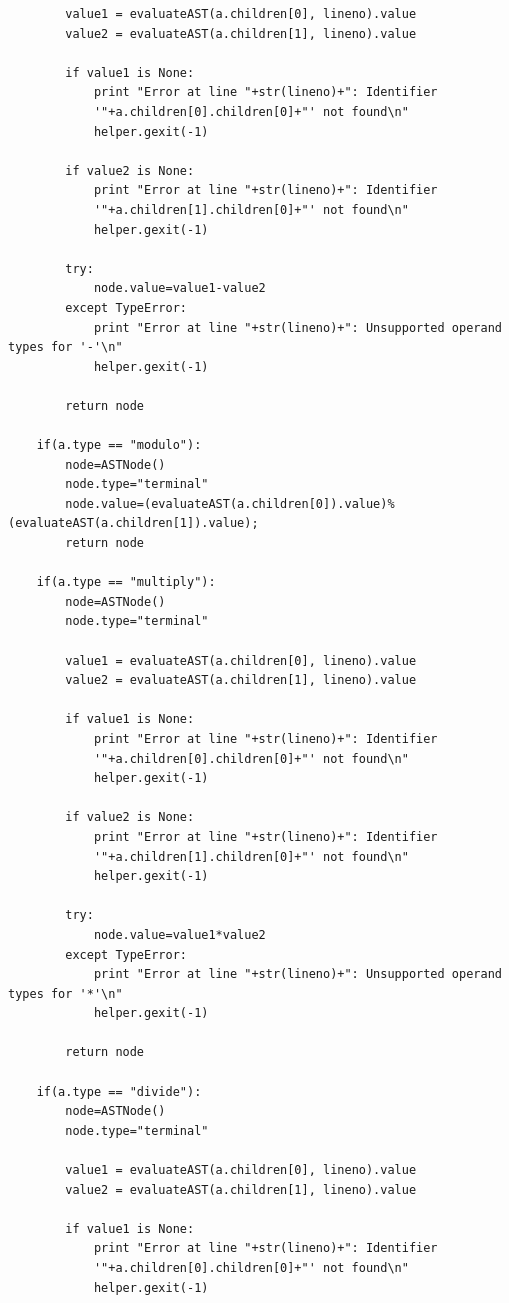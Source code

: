\documentclass[a4paper]{article}
\begin{document}
\begin{verbatim}
        value1 = evaluateAST(a.children[0], lineno).value
        value2 = evaluateAST(a.children[1], lineno).value

        if value1 is None:
            print "Error at line "+str(lineno)+": Identifier 
            '"+a.children[0].children[0]+"' not found\n"
            helper.gexit(-1)
            
        if value2 is None:
            print "Error at line "+str(lineno)+": Identifier 
            '"+a.children[1].children[0]+"' not found\n"
            helper.gexit(-1)

        try:
            node.value=value1-value2
        except TypeError:
            print "Error at line "+str(lineno)+": Unsupported operand types for '-'\n"
            helper.gexit(-1)

        return node
        
    if(a.type == "modulo"):
        node=ASTNode()
        node.type="terminal"
        node.value=(evaluateAST(a.children[0]).value)%(evaluateAST(a.children[1]).value);
        return node

    if(a.type == "multiply"):
        node=ASTNode()
        node.type="terminal"

        value1 = evaluateAST(a.children[0], lineno).value
        value2 = evaluateAST(a.children[1], lineno).value

        if value1 is None:
            print "Error at line "+str(lineno)+": Identifier 
            '"+a.children[0].children[0]+"' not found\n"
            helper.gexit(-1)
            
        if value2 is None:
            print "Error at line "+str(lineno)+": Identifier 
            '"+a.children[1].children[0]+"' not found\n"
            helper.gexit(-1)

        try:
            node.value=value1*value2
        except TypeError:
            print "Error at line "+str(lineno)+": Unsupported operand types for '*'\n"
            helper.gexit(-1)

        return node

    if(a.type == "divide"):
        node=ASTNode()
        node.type="terminal"

        value1 = evaluateAST(a.children[0], lineno).value
        value2 = evaluateAST(a.children[1], lineno).value

        if value1 is None:
            print "Error at line "+str(lineno)+": Identifier 
            '"+a.children[0].children[0]+"' not found\n"
            helper.gexit(-1)
            

\end{verbatim}
\end{document}
